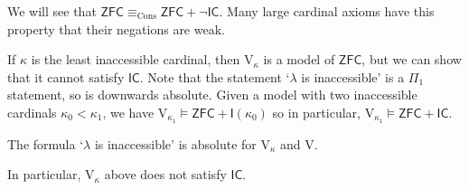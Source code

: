 We will see that \( \mathsf{ZFC} \equiv_{\mathrm{Cons}} \mathsf{ZFC} + \neg\mathsf{IC} \).
Many large cardinal axioms have this property that their negations are weak.

If \( \kappa \) is the least inaccessible cardinal, then \( \mathrm{V}_\kappa \) is a model of \( \mathsf{ZFC} \), but we can show that it cannot satisfy \( \mathsf{IC} \).
Note that the statement `\( \lambda \) is inaccessible' is a \( \Pi_1 \) statement, so is downwards absolute.
Given a model with two inaccessible cardinals \( \kappa_0 < \kappa_1 \), we have \( \mathrm{V}_{\kappa_1} \vDash \mathsf{ZFC} + \mathsf{I}(\kappa_0) \) so in particular, \( \mathrm{V}_{\kappa_1} \vDash \mathsf{ZFC} + \mathsf{IC} \).
\begin{lemma}
    The formula `\( \lambda \) is inaccessible' is absolute for \( \mathrm{V}_\kappa \) and \( \mathrm{V} \).
\end{lemma}
In particular, \( \mathrm{V}_\kappa \) above does not satisfy \( \mathsf{IC} \).

